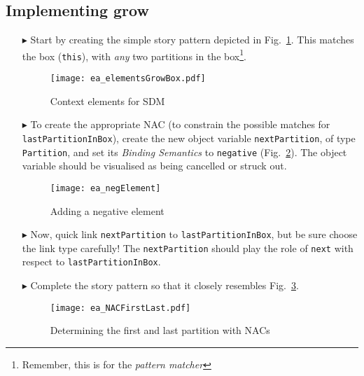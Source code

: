 \newpage
\subsection{Implementing grow}
\visHeader
\hypertarget{growBox vis}{}

\begin{itemize}
 
\item[$\blacktriangleright$] Start by creating the simple story pattern depicted in Fig.~\ref{fig:sdm_grow_1}. This matches the box
(\texttt{this}), with \emph{any} two partitions in the box\footnote{Remember, this is for the \emph{pattern matcher}}.

\begin{figure}[htbp]
\begin{center}
  \texttt{[image: ea\_elementsGrowBox.pdf]}
  \caption{Context elements for SDM}  
  \label{fig:sdm_grow_1}
\end{center}
\end{figure}

\item[$\blacktriangleright$] To create the appropriate \mbox{NAC} (to constrain the possible matches for \texttt{lastPartitionInBox}),  create the new object
variable \texttt{nextPartition}, of type \texttt{Partition}, and set  its \emph{Binding Semantics} to \texttt{negative}
(Fig.~\ref{fig:sdm_grow_2}). The object variable should be visualised as being cancelled or struck out. %
 
\begin{figure}[htbp]
\begin{center}
  \texttt{[image: ea\_negElement]}
  \caption{Adding a negative element}  
  \label{fig:sdm_grow_2}
\end{center}
\end{figure}
 
\item[$\blacktriangleright$] Now, quick link \texttt{nextPartition} to \texttt{lastPartitionInBox}, but be sure choose the link type carefully! The
\texttt{nextPartition} should play the role of \texttt{next} with respect to \texttt{lastPartitionInBox}.

\item[$\blacktriangleright$] Complete the story pattern so that it closely resembles Fig.~\ref{fig:sdm_grow_3}. 

\begin{figure}[htbp]
\begin{center}
  \texttt{[image: ea\_NACFirstLast.pdf]} 
  \caption{Determining the first and last partition with NACs}  
  \label{fig:sdm_grow_3}
\end{center}
\end{figure}
 

\end{itemize}

